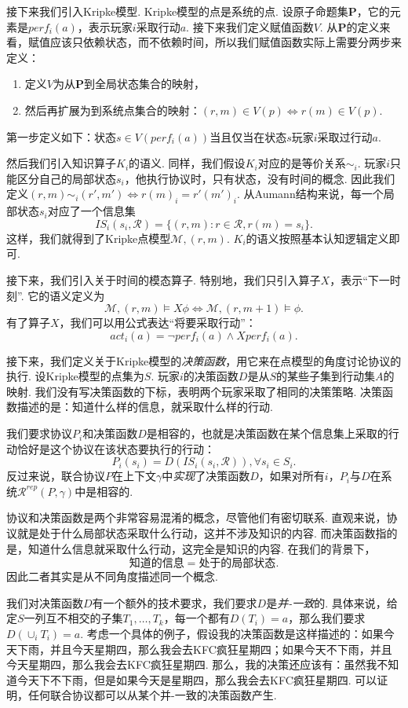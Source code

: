 接下来我们引入Kripke模型. Kripke模型的点是系统的点. 设原子命题集$\mathbf P$，它的元素是$perf_i(a)$，表示玩家$i$采取行动$a$. 接下来我们定义赋值函数$V$. 从$\mathbf P$的定义来看，赋值应该只依赖状态，而不依赖时间，所以我们赋值函数实际上需要分两步来定义：
\begin{enumerate}
    \item 定义$V$为从$\mathbf P$到全局状态集合的映射，
    \item 然后再扩展为到系统点集合的映射：$(r,m)\in V(p)\iff r(m)\in V(p)$.
\end{enumerate}
第一步定义如下：状态$s\in V(perf_i(a))$当且仅当在状态$s$玩家$i$采取过行动$a$.

然后我们引入知识算子$K_i$的语义. 同样，我们假设$K_i$对应的是等价关系$\sim_i$. 玩家$i$只能区分自己的局部状态$s_i$，他执行协议时，只有状态，没有时间的概念. 因此我们定义$(r,m)\sim_i (r',m')\iff r(m)_i=r'(m')_i$. 从Aumann结构来说，每一个局部状态$s_i$对应了一个信息集
    \[IS_i(s_i,\mathcal R)=\{(r,m):r\in\mathcal R,r(m)=s_i\}.\]
这样，我们就得到了Kripke点模型$\mathcal M,(r,m)$. $K_i$的语义按照基本认知逻辑定义即可.

接下来，我们引入关于时间的模态算子. 特别地，我们只引入算子$X$，表示“下一时刻”. 它的语义定义为
    \[\mathcal M,(r,m)\vDash X\phi\iff\mathcal M,(r,m+1)\vDash\phi.\]
有了算子$X$，我们可以用公式表达“将要采取行动”：
    \[act_i(a)=\neg perf_i(a)\wedge X perf_i(a).\]

接下来，我们定义关于Kripke模型的\emph{决策函数}，用它来在点模型的角度讨论协议的执行. 设Kripke模型的点集为$S$. 玩家$i$的决策函数$D$是从$S$的某些子集到行动集$A$的映射. 我们没有写决策函数的下标，表明两个玩家采取了相同的决策策略. 决策函数描述的是：知道什么样的信息，就采取什么样的行动. 

我们要求协议$P_i$和决策函数$D$是相容的，也就是决策函数在某个信息集上采取的行动恰好是这个协议在该状态要执行的行动：
    \[P_i(s_i)=D(IS_i(s_i,\mathcal R)),\forall s_i\in S_i.\]
反过来说，联合协议$P$在上下文$\gamma$中\emph{实现}了决策函数$D$，如果对所有$i$，$P_i$与$D$在系统$\mathcal R^{rep}(P,\gamma)$中是相容的.

协议和决策函数是两个非常容易混淆的概念，尽管他们有密切联系. 直观来说，协议就是处于什么局部状态采取什么行动，这并不涉及知识的内容. 而决策函数指的是，知道什么信息就采取什么行动，这完全是知识的内容. 在我们的背景下，
    \[\text{知道的信息}=\text{处于的局部状态}.\]
因此二者其实是从不同角度描述同一个概念.

我们对决策函数$D$有一个额外的技术要求，我们要求$D$是\emph{并-一致}的. 具体来说，给定$S$一列互不相交的子集$T_1,\dots,T_k$，每一个都有$D(T_i)=a$，那么我们要求$D(\cup_i T_i)=a$. 考虑一个具体的例子，假设我的决策函数是这样描述的：如果今天下雨，并且今天星期四，那么我会去KFC疯狂星期四；如果今天不下雨，并且今天星期四，那么我会去KFC疯狂星期四. 那么，我的决策还应该有：虽然我不知道今天下不下雨，但是如果今天是星期四，那么我会去KFC疯狂星期四. 可以证明，任何联合协议都可以从某个并-一致的决策函数产生.



